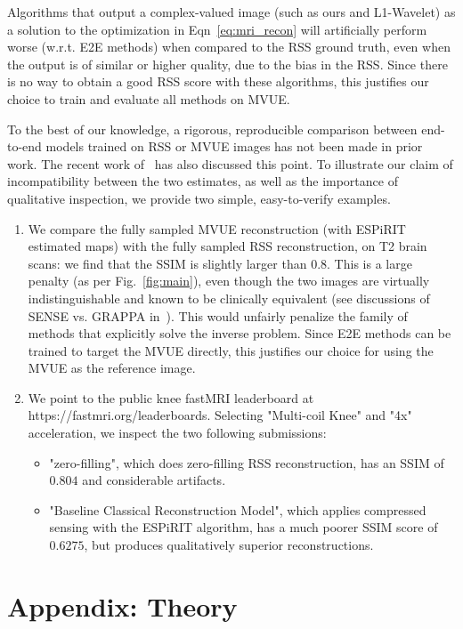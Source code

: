 Algorithms that output a complex-valued image (such as ours and L1-Wavelet) as a solution to the optimization in Eqn~\eqref{eq:mri_recon} will artificially perform worse (w.r.t. E2E methods) when compared to the RSS ground truth, even when the output is of similar or higher quality, due to the bias in the RSS. Since there is no way to obtain a good RSS score with these algorithms, this justifies our choice to train and evaluate all methods on MVUE.

To the best of our knowledge, a rigorous, reproducible comparison between end-to-end models trained on RSS or MVUE images has not been made in prior work. The recent work of~\cite{hammernik2021systematic} has also discussed this point. To illustrate our claim of incompatibility between the two estimates, as well as the importance of qualitative inspection, we provide two simple, easy-to-verify examples.

\begin{enumerate}
    \item  We compare the fully sampled MVUE reconstruction (with ESPiRIT estimated maps) with the fully sampled RSS reconstruction, on T2 brain scans: we find that the SSIM is slightly larger than $0.8$. This is a large penalty (as per Fig.~\ref{fig:main}), even though the two images are virtually indistinguishable and known to be clinically equivalent (see discussions of SENSE vs. GRAPPA in~\cite{hammernik2021systematic}). This would unfairly penalize the family of methods that explicitly solve the inverse problem. Since E2E methods can be trained to target the MVUE directly, this justifies our choice for using the MVUE as the reference image.
    \item We point to the public knee fastMRI leaderboard at https://fastmri.org/leaderboards. Selecting "Multi-coil Knee" and "4x" acceleration, we inspect the two following submissions:
    \begin{itemize}
        \item  "zero-filling", which does zero-filling RSS reconstruction, has an SSIM of $0.804$ and considerable artifacts.
        \item  "Baseline Classical Reconstruction Model", which applies compressed sensing with the ESPiRIT algorithm, has a much poorer SSIM score of $0.6275$, but produces qualitatively superior reconstructions.
    \end{itemize}
\end{enumerate}

\section{Appendix: Theory}\label{app:theory}

